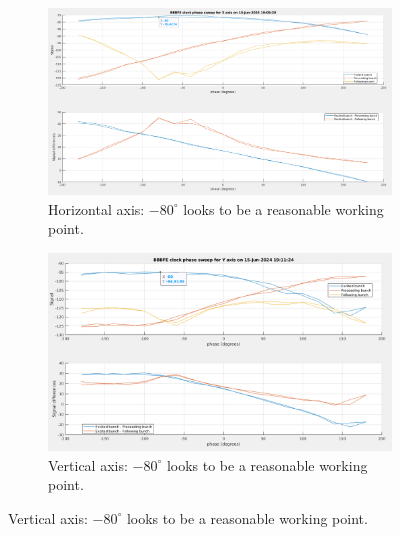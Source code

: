 \documentclass{report}
\begin{document}
\begin{figure}[hbt]
   \centering
    \begin{subfigure}[b]{0.48\textwidth}
        \includegraphics[width=\textwidth]{vlr_clock_phase_scan_x.png}
        \caption{Horizontal axis: $-80^\circ$ looks to be a reasonable working point.}
        \label{fig:frontend_clock_phase_scan_x}
    \end{subfigure}
    \begin{subfigure}[b]{0.48\textwidth}
        \includegraphics[width=\textwidth]{vlr_clock_phase_scan_y.png}
        \caption{Vertical axis: $-80^\circ$ looks to be a reasonable working point.}
        \label{fig:frontend_clock_phase_scan_y}
    \end{subfigure}
    

\end{figure}
\end{document}
